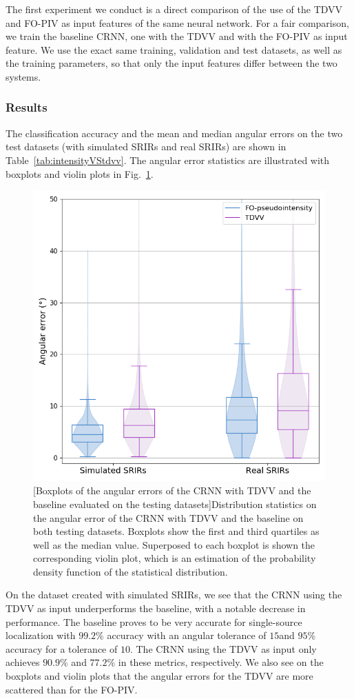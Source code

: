 The first experiment we conduct is a direct comparison of the use of the TDVV and FO-PIV as input features of the same neural network. For a fair comparison, we train the baseline CRNN, one with the TDVV and with the FO-PIV as input feature. We use the exact same training, validation and test datasets, as well as the training parameters, so that only the input features differ between the two systems.

\subsubsection{Results}

The classification accuracy and the mean and median angular errors on the two test datasets (with simulated SRIRs and real SRIRs) are shown in Table~\ref{tab:intensityVStdvv}. The angular error statistics are illustrated with boxplots and violin plots in Fig.~\ref{fig:boxplots_intensityVStdvv}.

\begin{figure}[t]
    \begin{center}
    \includegraphics[width=0.5\linewidth]{Images/chap6/boxplots_intensityVStdvv.png}
    [Boxplots of the angular errors of the CRNN with TDVV and the baseline evaluated on the testing datasets]{Distribution statistics on the angular error of the CRNN with TDVV and the baseline on both testing datasets. Boxplots show the first and third quartiles as well as the median value. Superposed to each boxplot is shown the corresponding violin plot, which is an estimation of the probability density function of the statistical distribution.}
    \label{fig:boxplots_intensityVStdvv}
    \end{center}
\end{figure}

On the dataset created with simulated SRIRs, we see that the CRNN using the TDVV as input underperforms the baseline, with a notable decrease in performance. The baseline proves to be very accurate for single-source localization \cite{perotin_crnn-based_2018} with $99.2$\% accuracy with an angular tolerance of $15$\textdegree and $95$\% accuracy for a tolerance of $10$\textdegree. The CRNN using the TDVV as input only achieves $90.9$\% and $77.2$\% in these metrics, respectively. We also see on the boxplots and violin plots that the angular errors for the TDVV are more scattered than for the FO-PIV.

